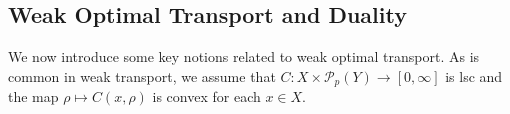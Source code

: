 \documentclass[reqno, a4paper]{amsart}
\newtheorem{lemma}[theorem]{Lemma}
\newcommand{\PP}{\mathcal{P}}
\theoremstyle{definition}
\newtheorem{definition}[theorem]{Definition}
\theoremstyle{definition}
\theoremstyle{definition}
\newtheorem{remark}[theorem]{Remark}
\begin{document}
    
    
\subsection{Weak Optimal Transport and Duality}\label{WOTD}
We now introduce some key notions related to weak optimal transport. As is common in weak transport, we assume that $C:X\times\PP_p(Y)\to[0,\infty]$ is lsc and the map $\rho\mapsto C(x,\rho)$ is convex for each $x\in X$.
    


    


\end{document}
